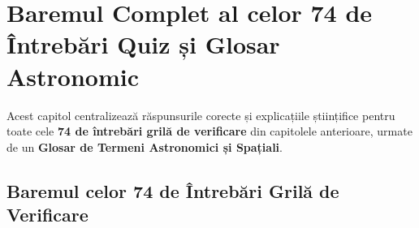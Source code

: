 \chapter{Baremul Complet al celor 74 de Întrebări Quiz și Glosar Astronomic}
\label{chap:barem-glosar}

Acest capitol centralizează răspunsurile corecte și explicațiile științifice pentru toate cele \textbf{74 de întrebări grilă de verificare} din capitolele anterioare, urmate de un \textbf{Glosar de Termeni Astronomici și Spațiali}.

\section{Baremul celor 74 de Întrebări Grilă de Verificare}

